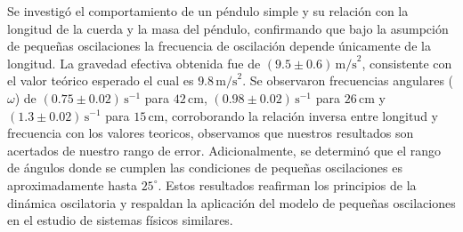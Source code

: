 \documentclass[12pt,a4]{article}
\begin{document}
Se investigó el comportamiento de un péndulo simple y su relación con la longitud de la cuerda y la masa del péndulo, confirmando que bajo la asumpción de pequeñas oscilaciones la frecuencia de oscilación depende únicamente de la longitud. La gravedad efectiva obtenida fue de \((9.5 \pm 0.6) \, \text{m/s}^2\), consistente con el valor teórico esperado el cual es \(9.8 \, \text{m/s}^2\). Se observaron frecuencias angulares (\(\omega\)) de \((0.75 \pm 0.02)\, \text{s}^{-1}\) para \(42 \, \text{cm}\), \((0.98 \pm 0.02) \, \text{s}^{-1}\) para \(26 \, \text{cm}\) y \((1.3 \pm 0.02) \, \text{s}^{-1}\) para \(15 \, \text{cm}\), corroborando la relación inversa entre longitud y frecuencia con los valores teoricos, observamos que nuestros resultados son acertados de nuestro rango de error. Adicionalmente, se determinó que el rango de ángulos donde se cumplen las condiciones de pequeñas oscilaciones es aproximadamente hasta $25^\circ$. Estos resultados reafirman los principios de la dinámica oscilatoria y respaldan la aplicación del modelo de pequeñas oscilaciones en el estudio de sistemas físicos similares.
\end{document}
